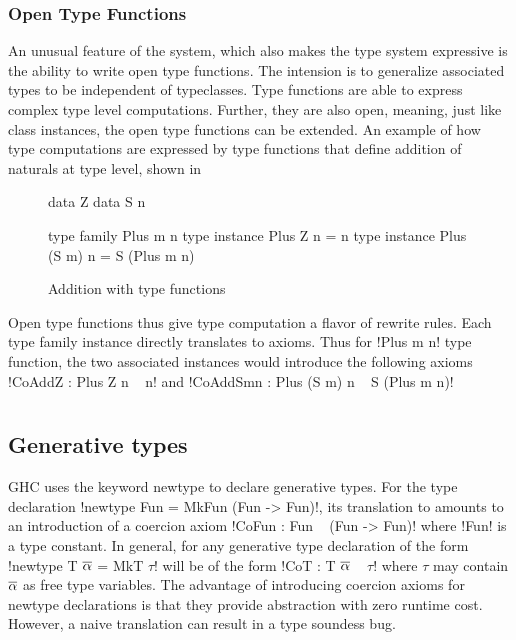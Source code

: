 \documentclass[manuscript,screen,nonacm]{acmart}
\begin{document}
\subsubsection{Open Type Functions}
An unusual feature of the system, which also makes the type system expressive is the ability to write open type functions. The intension is to generalize associated types to be independent of typeclasses. Type functions are able to express complex type level computations. Further, they are also open, meaning, just like class instances, the open type functions can be extended. An example of how type computations are expressed by type functions that define addition of naturals at type level, shown in 
\begin{figure}[ht]
  \begin{minipage}[ht]{0.4\linewidth}
    \begin{code}
      data Z
      data S n
    \end{code}
  \end{minipage}%
  \begin{minipage}[ht]{0.4\linewidth}
    \begin{code}
      type family Plus m n
      type instance Plus Z n = n
      type instance Plus (S m) n = S (Plus m n)
    \end{code}
  \end{minipage}
  \caption{Addition with type functions}
  \label{fig:open-type-fun-add}
\end{figure}
Open type functions thus give type computation a flavor of rewrite rules.
Each type family instance directly translates to axioms. Thus for !Plus m n! type function, the two associated instances would introduce the following axioms !CoAddZ : Plus Z n ~ n! and !CoAddSmn : Plus (S m) n ~ S (Plus m n)!



\section{\SFR}\label{sec:sfr} %
\subsection{Generative types}
GHC uses the keyword newtype to declare generative types. For the type declaration !newtype Fun = MkFun (Fun -> Fun)!, its translation to \SFC amounts to an introduction of a coercion axiom !CoFun : Fun ~ (Fun -> Fun)! where !Fun! is a type constant. In general, for any generative type declaration of the form !newtype T $\overline{\alpha}$ = MkT $\tau$! will be of the form !CoT : T $\overline{\alpha}$ ~ $\tau$! where $\tau$ may contain $\overline{\alpha}$ as free type variables. The advantage of introducing coercion axioms for newtype declarations is that they provide abstraction with zero runtime cost. However,
a naive translation can result in a type soundess bug\cite{TODO}.
\end{document}
